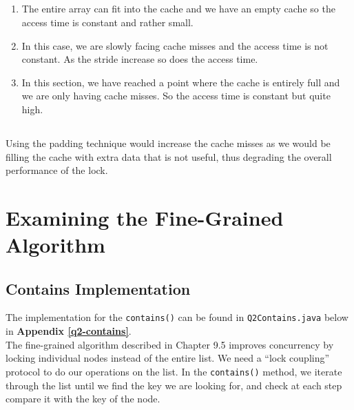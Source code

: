 \documentclass{article}%
\begin{document}
    \subsection{} 
        \begin{enumerate}[label=\textbf{Part \arabic*:},leftmargin=*,align=left]
            \item The entire array can fit into the cache and we have an empty cache so the access time is constant and rather small.
            
            \item In this case, we are slowly facing cache misses and the access time is not constant. As the stride increase so does the access time.
            
            \item In this section, we have reached a point where the cache is entirely full and we are only having cache misses. So the access time is constant but quite high.
        \end{enumerate}
     
    \subsection{}  
        Using the padding technique would increase the cache misses as we would be filling the cache with extra data that is not useful, thus degrading the overall performance of the lock.
        
\section{Examining the Fine-Grained Algorithm}
    \subsection{Contains Implementation}
        The implementation for the \texttt{contains()} can be found in \texttt{Q2Contains.java} below in \textbf{Appendix \ref{q2-contains}}. \\
        
        The fine-grained algorithm described in Chapter 9.5 improves concurrency by locking individual nodes instead of the entire list. We need a “lock coupling” protocol to do our operations on the list. In the \texttt{contains()} method, we iterate through the list until we find the key we are looking for, and check at each step compare it with the key of the node.
        
\end{document}
